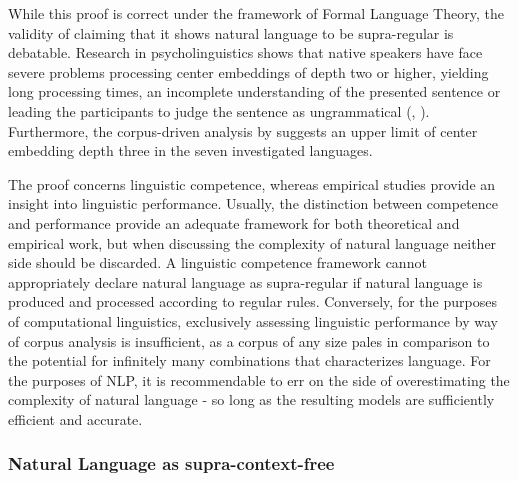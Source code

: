 While this proof is correct under the framework of Formal Language Theory, the validity of claiming that it shows natural language to be supra-regular is debatable. Research in psycholinguistics shows that native speakers have face severe problems processing center embeddings of depth two or higher, yielding long processing times, an incomplete understanding of the presented sentence or leading the participants to judge the sentence as ungrammatical (\cite{Hamilton1971}, \cite{Frank2016}). Furthermore, the corpus-driven analysis by \cite{Karlsson2007} suggests an upper limit of center embedding depth three in the seven investigated languages.

The proof concerns linguistic competence, whereas empirical studies provide an insight into linguistic performance. Usually, the distinction between competence and performance provide an adequate framework for both theoretical and empirical work, but when discussing the complexity of natural language neither side should be discarded. A linguistic competence framework cannot appropriately declare natural language as supra-regular if natural language is produced and processed according to regular rules. Conversely, for the purposes of computational linguistics, exclusively assessing linguistic performance by way of corpus analysis is insufficient, as a corpus of any size pales in comparison to the potential for infinitely many combinations that characterizes language. For the purposes of NLP, it is recommendable to err on the side of overestimating the complexity of natural language - so long as the resulting models are sufficiently efficient and accurate.

\subsubsection{Natural Language as supra-context-free}


